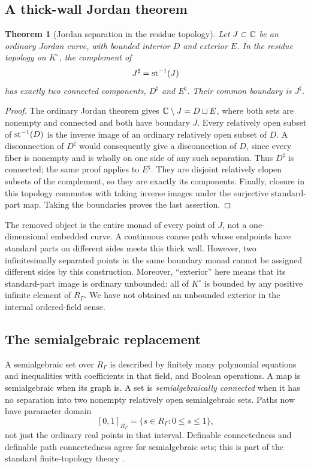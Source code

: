 \documentclass[11pt,letterpaper]{article}
\newtheorem{theorem}{Theorem}[section]
\theoremstyle{definition}
\theoremstyle{remark}
\newcommand{\sh}{^{\sharp}}\newcommand{\dd}{\,d}
\numberwithin{equation}{section}
\begin{document}
\subsection{A thick-wall Jordan theorem}
\begin{theorem}[Jordan separation in the residue topology]\label{thm:coarsejordan}
Let $J\subset\mathbb C$ be an ordinary Jordan curve, with bounded interior $D$ and exterior $E$. In the residue topology on $K^\circ$, the complement of
\[
 J\sh=\st^{-1}(J)
\]
has exactly two connected components, $D\sh$ and $E\sh$. Their common boundary is $J\sh$.
\end{theorem}
\begin{proof}
The ordinary Jordan theorem gives $\mathbb C\setminus J=D\sqcup E$, where both sets are nonempty and connected and both have boundary $J$. Every relatively open subset of $\operatorname{st}^{-1}(D)$ is the inverse image of an ordinary relatively open subset of $D$. A disconnection of $D\sh$ would consequently give a disconnection of $D$, since every fiber is nonempty and is wholly on one side of any such separation. Thus $D\sh$ is connected; the same proof applies to $E\sh$. They are disjoint relatively clopen subsets of the complement, so they are exactly its components. Finally, closure in this topology commutes with taking inverse images under the surjective standard-part map. Taking the boundaries proves the last assertion.
\end{proof}

The removed object is the entire monad of every point of $J$, not a one-dimensional embedded curve. A continuous coarse path whose endpoints have standard parts on different sides meets this thick wall. However, two infinitesimally separated points in the same boundary monad cannot be assigned different sides by this construction. Moreover, ``exterior'' here means that its standard-part image is ordinary unbounded: all of $K^\circ$ is bounded by any positive infinite element of $R_\Gamma$. We have not obtained an unbounded exterior in the internal ordered-field sense.

\subsection{The semialgebraic replacement}
A semialgebraic set over $R_\Gamma$ is described by finitely many polynomial equations and inequalities with coefficients in that field, and Boolean operations. A map is semialgebraic when its graph is. A set is \emph{semialgebraically connected} when it has no separation into two nonempty relatively open semialgebraic sets. Paths now have parameter domain
\[
 [0,1]_{R_\Gamma}=\{s\in R_\Gamma:0\le s\le1\},
\]
not just the ordinary real points in that interval. Definable connectedness and definable path connectedness agree for semialgebraic sets; this is part of the standard finite-topology theory \cite{BCR,BOhomology}.
\end{document}
